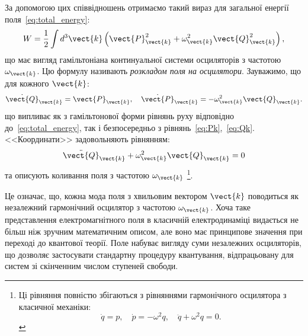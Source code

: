 За допомогою цих співвідношень отримаємо такий вираз для загальної енергії поля~\eqref{eq:total_energy}:
\begin{equation}
	W = \frac12 \int d^3\vect{k} \left( \vect{P}^2_{\vect{k}} + \omega^2_{\vect{k}}\vect{Q}^2_{\vect{k}}\right),
\end{equation}
що має вигляд гамільтоніана континуальної системи осциляторів з частотою $\omega_{\vect{k}}$. Цю формулу називають
\emph{розкладом поля на осцилятори}. Зауважимо, що для кожного $\vect{k}$:
\begin{equation*}
	\dot{\vect{Q}}_{\vect{k}} = \vect{P}_{\vect{k}}, \quad
	\dot{\vect{P}}_{\vect{k}} = - \omega^2_{\vect{k}} \vect{Q}_{\vect{k}}.
\end{equation*}
що випливає як з гамільтонової форми рівнянь руху відповідно до~\eqref{eq:total_energy}, так і безпосередньо з
рівнянь~\eqref{eq:Pk},~\eqref{eq:Qk}. <<Координати>> задовольняють рівнянням:
\begin{equation*}
	\ddot{\vect{Q}}_{\vect{k}} + \omega^2_{\vect{k}}\vect{Q}_{\vect{k}} = 0
\end{equation*}
та описують коливання поля з частотою $\omega_{\vect{k}}$%
\footnote{%
	Ці рівняння повністю збігаються з рівняннями гармонічного осцилятора з класичної механіки:
	\[
		\dot{q} = p,\quad \dot{p} = -\omega^2 q,\quad \ddot{q} + \omega^2 q = 0.
	\]
}.


Це означає, що, кожна мода поля з хвильовим вектором $\vect{k}$ поводиться як незалежний гармонічний осцилятор з
частотою $\omega_{\vect{k}}$. Хоча таке представлення електромагнітного поля в класичній електродинаміці видається не
більш ніж зручним математичним описом, але воно має принципове значення при переході до квантової теорії. Поле набуває
вигляду суми незалежних осциляторів, що дозволяє застосувати стандартну процедуру квантування, відпрацьовану для систем
зі скінченним числом ступеней свободи.

